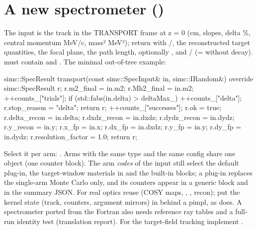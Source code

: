 \section{\texorpdfstring{A new spectrometer ()}{A new spectrometer (ISpectrometer)}}\label{developer_manual-04u5fextending:44-a-new-spectrometer-ispectrometer}
The input is the track in the TRANSPORT frame at z = 0 (cm, slopes, delta \%, central momentum MeV/c, mass² MeV²);
return  with /, the reconstructed target quantities, the focal plane, the path length,
optionally , and / (=  without decay).  must contain
 and . The minimal out-of-tree example:

\begin{simccode}[basicstyle=\ttfamily\footnotesize,style=simccpp]
    simc::SpecResult transport(const simc::SpecInput& in, simc::IRandom&) override {
        simc::SpecResult r;
        r.m2_final = in.m2;
        r.Mh2_final = in.m2;
        ++counts_["trials"];
        if (std::fabs(in.delta) > deltaMax_) {
            ++counts_["delta"];
            r.stop_reason = "delta";
            return r;
        }
        ++counts_["successes"];
        r.ok = true;
        r.delta_recon = in.delta;
        r.dxdz_recon = in.dxdz;
        r.dydz_recon = in.dydz;
        r.y_recon = in.y;
        r.x_fp = in.x;
        r.dx_fp = in.dxdz;
        r.y_fp = in.y;
        r.dy_fp = in.dydz;
        r.resolution_factor = 1.0;
        return r;
    }
\end{simccode}
Select it per arm: . Arms with the
same type and the same config share one object (one counter block). The arm \emph{codes} of the input still select the
default plug-in, the target-window materials in  and the built-in  blocks; a plug-in replaces the
single-arm Monte Carlo only, and its counters appear in a generic  block and in the summary JSON. For real optics
reuse  (COSY maps, , , recon); put the kernel state (track, counters,
argument mirrors) in  behind a pimpl, as  does. A spectrometer ported
from the Fortran also needs reference ray tables and a full-run identity test (translation report). For the target-field tracking implement .

